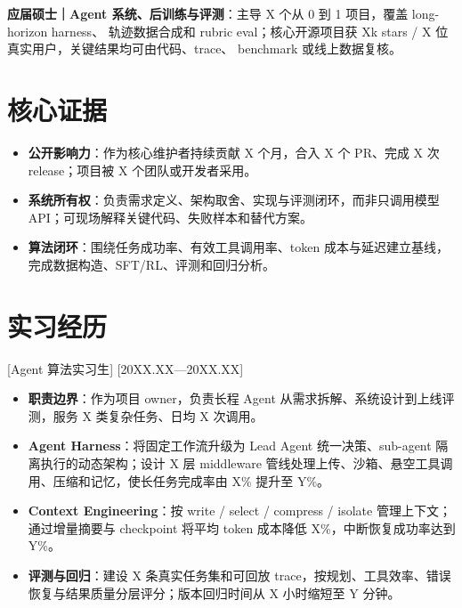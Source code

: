 \documentclass{resume-photo}
\newcommand{\Signal}[1]{\textbf{\textcolor{ResumeBlue}{#1}}}
\begin{document}
\selectfont

\ResumeTitle

\noindent
\Signal{应届硕士｜Agent 系统、后训练与评测}：主导 X 个从 0 到 1 项目，覆盖 long-horizon harness、
轨迹数据合成和 rubric eval；核心开源项目获 Xk stars / X 位真实用户，关键结果均可由代码、trace、
benchmark 或线上数据复核。

\section{核心证据}
\begin{itemize}
  \item \textbf{公开影响力}：作为核心维护者持续贡献 X 个月，合入 X 个 PR、完成 X 次 release；项目被 X 个团队或开发者采用。
  \item \textbf{系统所有权}：负责需求定义、架构取舍、实现与评测闭环，而非只调用模型 API；可现场解释关键代码、失败样本和替代方案。
  \item \textbf{算法闭环}：围绕任务成功率、有效工具调用率、token 成本与延迟建立基线，完成数据构造、SFT/RL、评测和回归分析。
\end{itemize}

\section{实习经历}
[\textnormal{Agent 算法实习生}]
[20XX.XX—20XX.XX]
\begin{itemize}
  \item \textbf{职责边界}：作为项目 owner，负责长程 Agent 从需求拆解、系统设计到上线评测，服务 X 类复杂任务、日均 X 次调用。
  \item \textbf{Agent Harness}：将固定工作流升级为 Lead Agent 统一决策、sub-agent 隔离执行的动态架构；设计 X 层 middleware 管线处理上传、沙箱、悬空工具调用、压缩和记忆，使长任务完成率由 X\% 提升至 Y\%。
  \item \textbf{Context Engineering}：按 write / select / compress / isolate 管理上下文；通过增量摘要与 checkpoint 将平均 token 成本降低 X\%，中断恢复成功率达到 Y\%。
  \item \textbf{评测与回归}：建设 X 条真实任务集和可回放 trace，按规划、工具效率、错误恢复与结果质量分层评分；版本回归时间从 X 小时缩短至 Y 分钟。
\end{itemize}
\end{document}
